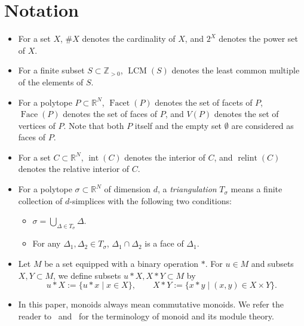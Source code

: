 \section{Notation}\label{section:notation}
\begin{itemize}
\item 
For a set $X$, $\# X$ denotes the cardinality of $X$, and $2 ^X$ denotes the power set of $X$. 


\item
For a finite subset $S \subset \mathbb{Z}_{>0}$, $\operatorname{LCM}(S)$ denotes the least common multiple of the elements of $S$. 

\item 
For a polytope $P \subset \mathbb{R}^N$, 
$\operatorname{Facet}(P)$ denotes the set of facets of $P$, 
$\operatorname{Face}(P)$ denotes the set of faces of $P$, and 
$V(P)$ denotes the set of vertices of $P$. 
Note that both $P$ itself and the empty set $\emptyset$ are considered as faces of $P$. 

\item 
For a set $C \subset \mathbb{R}^N$, 
$\operatorname{int}(C)$ denotes the interior of $C$, and 
$\operatorname{relint}(C)$ denotes the relative interior of $C$. 

\item
For a polytope $\sigma \subset \mathbb{R}^N$ of dimension $d$, 
a \textit{triangulation} $T_{\sigma}$ means a finite collection of $d$-simplices with the following two conditions: 
\begin{itemize}
\item $\sigma = \bigcup _{\Delta \in T_{\sigma}} \Delta$. 
\item For any $\Delta _1, \Delta _2 \in T_{\sigma}$, $\Delta _1 \cap \Delta _2$ is a face of $\Delta _1$. 
\end{itemize}

\item 
Let $M$ be a set equipped with a binary operation $*$. 
For $u \in M$ and subsets $X, Y \subset M$, we define subsets $u * X, X * Y \subset M$ by
\[
u * X := \{ u * x \mid x \in X \}, \qquad
X * Y := \{ x * y \mid (x,y) \in X \times Y \}. 
\]

\item
In this paper, monoids always mean commutative monoids. 
We refer the reader to~\cite{BG2009} and~\cite{NSMN21} for the terminology of monoid and its module theory. 

\end{itemize}

